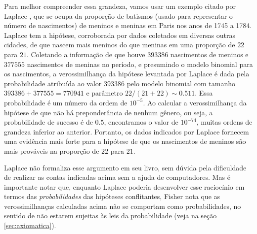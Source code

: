 Para melhor compreender essa grandeza, vamos usar um exemplo citado por Laplace \citep{Laplace1814}, que se ocupa da 
proporção de batismos (usado para representar o número de nascimentos) de meninos e meninas em Paris nos anos 
de 1745 a 1784. Laplace tem a hipótese, corroborada por dados coletados em diversas outras cidades, de que nascem mais meninos
do que meninas em uma proporção de $22$ para $21$. Coletando a
informação de que houve $393386$ nascimentos de meninos e $377555$
nascimentos de meninas no período, e presumindo o modelo binomial para os nascimentos, a verossimilhança da hipótese levantada
por Laplace é dada pela probabilidade atribuída ao valor $393386$ pelo modelo binomial com tamanho $393386 + 377555 = 770941$
e parâmetro $22/(21+22) \sim 0.511$. Essa probabilidade é um número da ordem de $10^{-5}$. Ao calcular a 
verossimilhança da hipótese de que não há preponderância de nenhum gênero, ou seja, a probabilidade de sucesso é de $0.5$, 
encontramos o valor de $10^{-74}$, muitas ordens de grandeza inferior ao anterior. Portanto, os dados indicados por Laplace
fornecem uma evidência mais forte para a hipótese de que os nascimentos de meninos são mais prováveis na proporção de $22$
para $21$. 

Laplace não formaliza esse argumento em seu livro, sem dúvida pela dificuldade de realizar as contas indicadas acima sem
a ajuda de computadores. Mas é importante notar que, enquanto Laplace poderia desenvolver esse raciocínio em termos das 
{\em probabilidades} das hipóteses conflitantes, Fisher nota que as verossimilhanças calculadas acima não se comportam como 
probabilidades, no sentido de não estarem sujeitas às leis da
probabilidade (veja na seção \ref{sec:axiomatica}).

